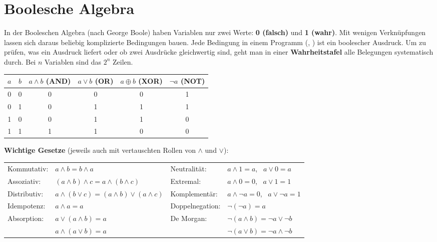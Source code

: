 \section{Boolesche Algebra}
\worum
In der Booleschen Algebra (nach George Boole) haben Variablen nur zwei Werte: \textbf{0 (falsch)} und \textbf{1 (wahr)}. Mit wenigen Verknüpfungen lassen sich daraus beliebig komplizierte Bedingungen bauen. Jede Bedingung in einem Programm (, ) ist ein boolescher Ausdruck. Um zu prüfen, was ein Ausdruck liefert oder ob zwei Ausdrücke gleichwertig sind, geht man in einer \textbf{Wahrheitstafel} alle Belegungen systematisch durch. Bei $n$ Variablen sind das $2^n$ Zeilen.

\begin{merke}
\begin{center}
\begin{tabular}{cc|cccc}
$a$ & $b$ & $a \wedge b$ (AND) & $a \vee b$ (OR) & $a \oplus b$ (XOR) & $\neg a$ (NOT) \\ \hline
0 & 0 & 0 & 0 & 0 & 1 \\
0 & 1 & 0 & 1 & 1 & 1 \\
1 & 0 & 0 & 1 & 1 & 0 \\
1 & 1 & 1 & 1 & 0 & 0
\end{tabular}
\end{center}
\textbf{Wichtige Gesetze} (jeweils auch mit vertauschten Rollen von $\wedge$ und $\vee$):

\smallskip
\begin{tabular}{@{}ll@{\qquad}ll@{}}
Kommutativ: & $a \wedge b = b \wedge a$ & Neutralität: & $a \wedge 1 = a$, \ $a \vee 0 = a$ \\
Assoziativ: & $(a \wedge b) \wedge c = a \wedge (b \wedge c)$ & Extremal: & $a \wedge 0 = 0$, \ $a \vee 1 = 1$ \\
Distributiv: & $a \wedge (b \vee c) = (a \wedge b) \vee (a \wedge c)$ & Komplementär: & $a \wedge \neg a = 0$, \ $a \vee \neg a = 1$ \\
Idempotenz: & $a \wedge a = a$ & Doppelnegation: & $\neg(\neg a) = a$ \\
Absorption: & $a \vee (a \wedge b) = a$ & De Morgan: & $\neg(a \wedge b) = \neg a \vee \neg b$ \\
 & $a \wedge (a \vee b) = a$ & & $\neg(a \vee b) = \neg a \wedge \neg b$
\end{tabular}
\end{merke}

